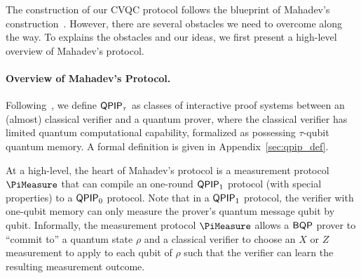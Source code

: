

% 


The construction of our CVQC protocol follows the blueprint of Mahadev's construction~\cite{FOCS:Mahadev18a}. However, there are several obstacles we need to overcome along the way. To explains the obstacles and our ideas, we first present a high-level overview of Mahadev's protocol.



\paragraph{Overview of Mahadev's Protocol.}
%
Following~\cite{FOCS:Mahadev18a}, we define $\operatorname{\mathsf{QPIP}}_{\tau}$ as classes of interactive proof systems between an (almost) classical verifier and a quantum prover, where the classical verifier has limited quantum computational capability, formalized as possessing $\tau$-qubit quantum memory. %
A formal definition is given in Appendix~\ref{sec:qpip_def}. 

At a high-level, the heart of Mahadev's protocol is a measurement protocol $\PiMeasure$ that can compile an one-round $\operatorname{\mathsf{QPIP}}_1$ protocol (with special properties) to a $\operatorname{\mathsf{QPIP}}_0$ protocol. Note that in a $\operatorname{\mathsf{QPIP}}_1$ protocol, the verifier with one-qubit memory can only measure the prover's quantum message qubit by qubit. Informally, the measurement protocol $\PiMeasure$ allows a $\operatorname{\mathsf{BQP}}$ prover to ``commit to'' a quantum state $\rho$ and a classical verifier to choose an $X$ or $Z$ measurement to apply to each qubit of $\rho$ such that the verifier can learn the resulting measurement outcome. 

